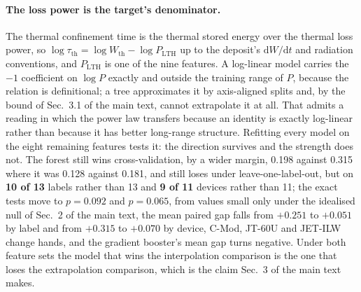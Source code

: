 \documentclass[12pt,letterpaper]{article}
\begin{document}
\paragraph{The loss power is the target's denominator.} The thermal confinement
time is the thermal stored energy over the thermal loss power, so
$\log\tau_{\mathrm{th}} = \log W_{\mathrm{th}} - \log P_{\mathrm{LTH}}$ up to
the deposit's $\mathrm{d}W/\mathrm{d}t$ and radiation conventions, and
$P_{\mathrm{LTH}}$ is one of the nine features. A log-linear model carries the
$-1$ coefficient on $\log P$ exactly and outside the training range of $P$,
because the relation is definitional; a tree approximates it by axis-aligned
splits and, by the bound of Sec.~3.1 of the main text, cannot extrapolate it at
all. That admits a reading in which the power law transfers because an identity
is exactly log-linear rather than because it has better long-range structure.
Refitting every model on the eight remaining features tests it: the direction
survives and the strength does not. The forest still wins cross-validation, by
a wider margin, 0.198 against 0.315 where it was 0.128 against 0.181, and
still loses under leave-one-label-out, but on \textbf{10 of 13} labels rather
than 13 and \textbf{9 of 11} devices rather than 11; the exact tests move to
$p=0.092$ and $p=0.065$, from values small only under the idealised null of
Sec.~2 of the main text, the mean paired gap falls from $+0.251$ to $+0.051$ by label and from $+0.315$
to $+0.070$ by device,
C-Mod, JT-60U and JET-ILW change hands, and the gradient booster's mean gap
turns negative. Under both feature sets the model that wins the interpolation
comparison is the one that loses the extrapolation comparison, which is the
claim Sec.~3 of the main text makes.
\end{document}
